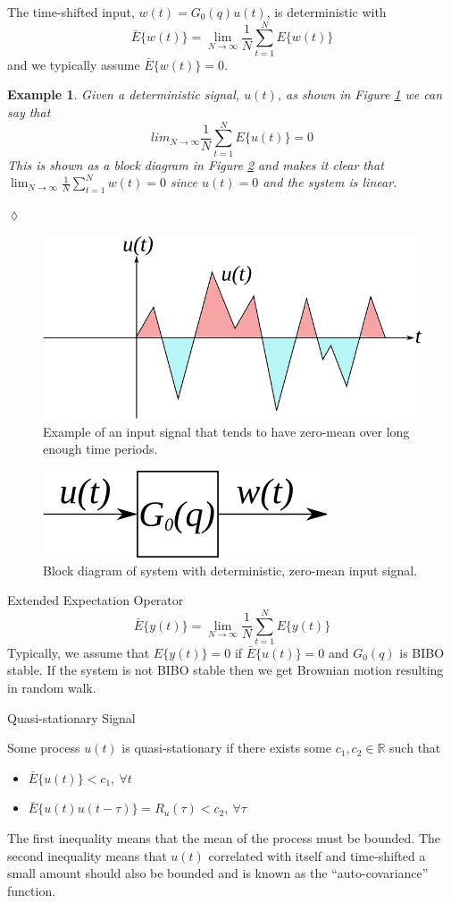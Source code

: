 \documentclass[lecture,12pt,]{pcms-l}
\theoremstyle{example}
\newtheorem{example}{Example}[section]
\begin{document}
The time-shifted input, $w(t)=G_0(q)u(t)$, is deterministic with
$$\bar{E}\{w(t)\} = \lim_{N\to\infty}\frac{1}{N}\sum_{t=1}^NE\{w(t)\}$$
and we typically assume $\bar{E}\{w(t)\}=0$.

\begin{example}
Given a deterministic signal, $u(t)$, as shown in Figure \ref{fig:04inputSignal} we can say that
$$lim_{N\to\infty}\frac{1}{N}\sum_{t=1}^NE\{u(t)\} = 0$$
This is shown as a block diagram in Figure \ref{fig:04detSignal} and makes it clear that $\lim_{N\to\infty}\frac{1}{N}\sum_{t=1}^Nw(t)=0$ since $u(t)=0$ and the system is linear.
\end{example}
$\lozenge$
\begin{figure}[ht!]
	\centering
	\includegraphics[width=.5\textwidth]{images/04inputSignal}
	\caption{Example of an input signal that tends to have zero-mean over long enough time periods.}
	\label{fig:04inputSignal}
\end{figure}

\begin{figure}[ht!]
	\centering
	\includegraphics[width=.5\textwidth]{images/04detSignal}
	\caption{Block diagram of system with deterministic, zero-mean input signal.}
	\label{fig:04detSignal}
\end{figure}

\begin{definition}{Extended Expectation Operator}
$$\bar{E}\{y(t)\}=\lim_{N\to\infty}\frac{1}{N}\sum_{t=1}^NE\{y(t)\}$$
Typically, we assume that $E\{y(t)\}=0$ if $\bar{E}\{u(t)\}=0$ and $G_0(q)$ is BIBO stable. If the system is not BIBO stable then we get Brownian motion resulting in random walk.
\end{definition}

\begin{definition}{Quasi-stationary Signal}

Some process $u(t)$ is quasi-stationary if there exists some $c_1, c_2 \in\mathbb{R}$ such that
\begin{itemize}
\item $\bar{E}\{u(t)\} < c_1, ~\forall t$
\item $\bar{E}\{u(t)u(t-\tau)\} = R_u(\tau) < c_2, ~\forall \tau$
\end{itemize}
The first inequality means that the mean of the process must be bounded. The second inequality means that $u(t)$ correlated with itself and time-shifted a small amount should also be bounded and is known as the ``auto-covariance'' function.
\end{definition}
\end{document}
